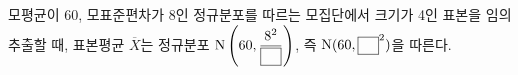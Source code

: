 모평균이 60, 모표준편차가 8인 정규분포를 따르는 모집단에서 크기가 4인 표본을 임의추출할 때, 표본평균 $\overline{X}$는 정규분포 $\mathrm{N}\left(60{,}\mkern3mu\mathopen{}\dfrac{8^2}{\blank}\right)$, 즉 $\mathrm{N}(60{,}\mkern3mu\mathopen{}\blank^{2})$을 따른다.
